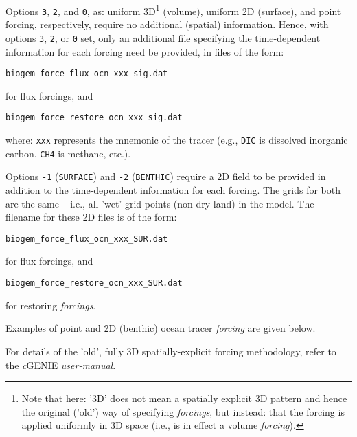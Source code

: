 \documentclass[10pt,twoside]{article}
\begin{document}
Options \texttt{3}, \texttt{2}, and \texttt{0}, as: uniform 3D\footnote{Note that here: '3D' does not mean a spatially explicit 3D pattern and hence the original ('old') way of specifying \textit{forcings}, but instead: that the forcing is applied uniformly in 3D space (i.e., is in effect a volume \textit{forcing}).} (volume), uniform 2D (surface), and point forcing, respectively, require no additional (spatial) information. Hence, with options \texttt{3}, \texttt{2}, or \texttt{0} set, only an additional file specifying the time-dependent information for each forcing need be provided, in files of the form:
\vspace{-10pt}\begin{verbatim}
biogem_force_flux_ocn_xxx_sig.dat
\end{verbatim}\vspace{-10pt}
for flux forcings, and 
\vspace{-10pt}\begin{verbatim}
biogem_force_restore_ocn_xxx_sig.dat
\end{verbatim}\vspace{-10pt}
where: \texttt{xxx} represents the mnemonic of the tracer (e.g., \texttt{DIC} is dissolved inorganic carbon. \texttt{CH4} is methane, etc.).

Options \texttt{-1} (\texttt{SURFACE}) and \texttt{-2} (\texttt{BENTHIC}) require a 2D field to be provided in addition to the time-dependent information for each forcing. The grids for both are the same -- i.e., all 'wet' grid points (non dry land) in the model. The filename for these 2D files is of the form:
\vspace{-10pt}\begin{verbatim}
biogem_force_flux_ocn_xxx_SUR.dat
\end{verbatim}\vspace{-10pt}
for flux forcings, and 
\vspace{-10pt}\begin{verbatim}
biogem_force_restore_ocn_xxx_SUR.dat
\end{verbatim}\vspace{-10pt}
for restoring \textit{forcings}.

Examples of point and 2D (benthic) ocean tracer \textit{forcing} are given below.
	
For details of the 'old', fully 3D spatially-explicit forcing methodology, refer to the \textit{c}GENIE \textit{user-manual}.


\end{document}

